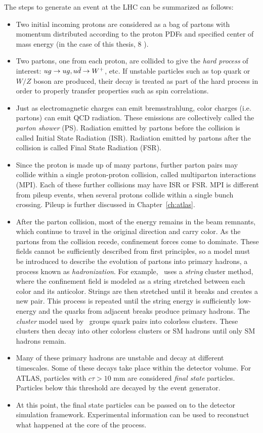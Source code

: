 The steps to generate an event at the LHC can be summarized as follows:
\begin{itemize}
\item Two initial incoming protons are considered as a bag of partons with momentum distributed according to the proton PDFs and specified center of mass energy (in the case of this thesis, 8 \tev).
\item Two partons, one from each proton, are collided to give the \emph{hard process} of interest: $ug \rightarrow ug, u\bar{d}\rightarrow W^{+}$, etc. If unstable particles such as top quark or $W/Z$ boson are produced, their decay is treated as part of the hard process in order to properly transfer properties such as spin correlations.
\item Just as electromagnetic charges can emit bremsstrahlung, color charges (i.e. partons) can emit QCD radiation. These emissions are collectively called the \emph{parton shower} (PS). Radiation emitted by partons before the collision is called Initial State Radiation (ISR). Radiation emitted by partons after the collision is called Final State Radiation (FSR).  
\item Since the proton is made up of many partons, further parton pairs may collide within a single proton-proton collision, called multiparton interactions (MPI). Each of these further collisions may have ISR or FSR. MPI is different from pileup events, when several protons collide within a single bunch crossing. Pileup is further discussed in Chapter~\ref{ch:atlas}.
\item After the parton collision, most of the energy remains in the beam remnants, which continue to travel in the original direction and carry color. As the partons from the collision recede, confinement forces come to dominate. These fields cannot be sufficiently described from first principles, so a model must be introduced to describe the evolution of partons into primary hadrons, a process known as \emph{hadronization}. For example, \py\ uses a \emph{string} cluster method, where the confinement field is modeled as a string stretched between each color and its anticolor. Strings are then stretched until it breaks and creates a new pair. This process is repeated until the string energy is sufficiently low-energy and the quarks from adjacent breaks produce primary hadrons. The \emph{cluster} model used by \hw\ groups quark pairs into colorless clusters. These clusters then decay into other colorless clusters or SM hadrons until only SM hadrons remain.
\item Many of these primary hadrons are unstable and decay at different timescales. Some of these decays take place within the detector volume. For ATLAS, particles with $c\tau > 10$ mm are considered \emph{final state} particles. Particles below this threshold are decayed by the event generator. 
\item At this point, the final state particles can be passed on to the detector simulation framework. Experimental information can be used to reconstuct what happened at the core of the process.
\end{itemize}

